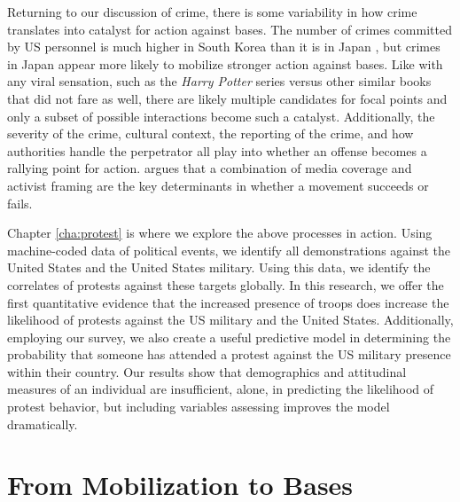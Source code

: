 {	Returning to our discussion of crime, there is some variability in how crime translates into catalyst for action against bases. The number of crimes committed by US personnel is much higher in South Korea than it is in Japan \cite{Gillem2007}, but crimes in Japan appear more likely to mobilize stronger action against bases. Like with any viral sensation, such as the \textit{Harry Potter} series versus other similar books that did not fare as well, there are likely multiple candidates for focal points and only a subset of possible interactions become such a catalyst. Additionally, the severity of the crime, cultural context, the reporting of the crime, and how authorities handle the perpetrator all play into whether an offense becomes a rallying point for action.  argues that a combination of media coverage and activist framing are the key determinants in whether a movement succeeds or fails.
	
	
	Chapter \ref{cha:protest} is where we explore the above processes in action. Using machine-coded data of political events, we identify all demonstrations against the United States and the United States military. Using this data, we identify the correlates of protests against these targets globally. In this research, we offer the first quantitative evidence that the increased presence of troops does increase the likelihood of protests against the US military and the United States. Additionally, employing our survey, we also create a useful predictive model in determining the probability that someone has attended a protest against the US military presence within their country. Our results show that demographics and attitudinal measures of an individual are insufficient, alone, in predicting the likelihood of protest behavior, but including variables assessing improves the model dramatically. 
	
	
	
	
\section*{From Mobilization to Bases}
	
}
